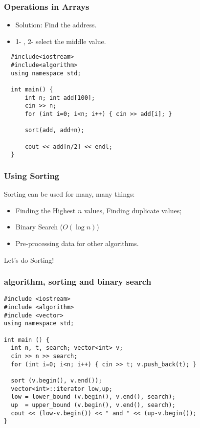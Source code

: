 \begin{frame}[fragile]
  \frametitle{Operations in Arrays}

  \begin{itemize}
  \item Solution: Find the  address.
  \item 1- , 2- select the middle value.
  \end{itemize}

\begin{verbatim}
  #include<iostream>
  #include<algorithm>
  using namespace std;

  int main() {
      int n; int add[100];
      cin >> n;
      for (int i=0; i<n; i++) { cin >> add[i]; }

      sort(add, add+n);

      cout << add[n/2] << endl;
  }
\end{verbatim}
\end{frame}

\begin{frame}
  \frametitle{Using Sorting}
  Sorting can be used for \alert{many, many} things:

  \bigskip

    \begin{itemize}
    \item Finding the Highest $n$ values, Finding duplicate values;
      \bigskip

    \item Binary Search ($O(\log n)$)
      \bigskip

    \item Pre-processing data for other algorithms.
    \end{itemize}

  \bigskip
  Let's do Sorting!
\end{frame}

\begin{frame}[fragile]
  \frametitle{algorithm, sorting and binary search}
{\small
\begin{block}{}
\begin{verbatim}
#include <iostream>
#include <algorithm>
#include <vector>
using namespace std;

int main () {
  int n, t, search; vector<int> v;
  cin >> n >> search;
  for (int i=0; i<n; i++) { cin >> t; v.push_back(t); }

  sort (v.begin(), v.end());
  vector<int>::iterator low,up;
  low = lower_bound (v.begin(), v.end(), search);
  up  = upper_bound (v.begin(), v.end(), search);
  cout << (low-v.begin()) << " and " << (up-v.begin());
}
\end{verbatim}
\end{block}}
\end{frame}


